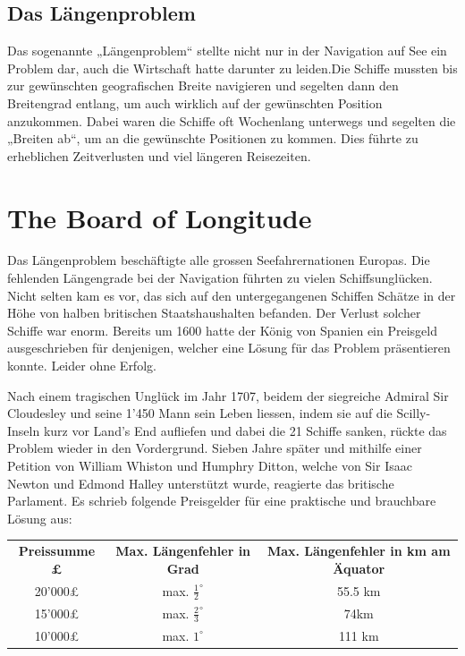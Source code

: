 \begin{refsection}
\subsection{Das Längenproblem}
Das sogenannte „Längenproblem“ stellte nicht nur in der Navigation auf See ein Problem dar, auch die Wirtschaft hatte darunter zu leiden.Die Schiffe mussten bis zur gewünschten geografischen Breite navigieren und segelten dann den Breitengrad entlang, um auch wirklich auf der gewünschten Position anzukommen. Dabei waren die Schiffe oft Wochenlang unterwegs und segelten die „Breiten ab“, um an die gewünschte Positionen zu kommen. Dies führte zu erheblichen Zeitverlusten und viel längeren Reisezeiten.


\section{The Board of Longitude}
Das Längenproblem beschäftigte alle grossen Seefahrernationen Europas. Die fehlenden Längengrade bei der Navigation führten zu vielen Schiffsunglücken. Nicht selten kam es vor, das sich auf den untergegangenen Schiffen Schätze in der Höhe von halben britischen Staatshaushalten befanden. Der Verlust solcher Schiffe war enorm.
Bereits um 1600 hatte der König von Spanien ein Preisgeld ausgeschrieben für denjenigen, welcher eine Lösung für das Problem präsentieren konnte. Leider ohne Erfolg.

Nach einem tragischen Unglück im Jahr 1707, beidem der siegreiche Admiral Sir Cloudesley und seine 1’450 Mann sein Leben liessen, indem sie auf die Scilly-Inseln kurz vor Land’s End aufliefen und dabei die 21 Schiffe sanken, rückte das Problem wieder in den Vordergrund.
Sieben Jahre später und mithilfe einer Petition von William Whiston und Humphry Ditton, welche von Sir Isaac Newton und Edmond Halley unterstützt wurde, reagierte das britische Parlament.
Es schrieb folgende Preisgelder für eine praktische und brauchbare Lösung aus:

\begin{center}
\renewcommand{\arraystretch}{2}
\begin{tabular}{ccc}
\textbf{Preissumme £} & \textbf{Max. Längenfehler in Grad} & \textbf{Max. Längenfehler in km am Äquator}  \\
20’000£ & max. $\frac{1}{2}^{\circ}$ & 55.5 km \\
15’000£ & max. $\frac{2}{3}^{\circ}$ & 74km \\
10’000£ & max. $1 ^{\circ}$ & 111 km 
\end{tabular}
\end{center}


\end{refsection}
